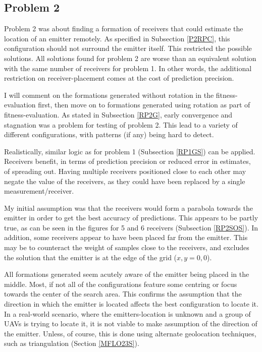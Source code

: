\documentclass[10pt,a4paper]{book}
\begin{document}
\newpage
\subsection{Problem 2}

Problem 2 was about finding a formation of receivers that could estimate the location of an emitter remotely. As specified in Subsection \ref{P2RPC}, this configuration should not surround the emitter itself. This restricted the possible solutions. All solutions found for problem 2 are worse than an equivalent solution with the same number of receivers for problem 1. In other words, the additional restriction on receiver-placement comes at the cost of prediction precision. 

I will comment on the formations generated without rotation in the fitness-evaluation first, then move on to formations generated using rotation as part of fitness-evaluation. As stated in Subsection \ref{RP2G}, early convergence and stagnation was a problem for testing of problem 2. This lead to a variety of different configurations, with patterns (if any) being hard to detect. 

Realistically, similar logic as for problem 1 (Subsection \ref{RP1GS}) can be applied. Receivers benefit, in terms of prediction precision or reduced error in estimates, of spreading out. Having multiple receivers positioned close to each other may negate the value of the receivers, as they could have been replaced by a single measurement/receiver. 

My initial assumption was that the receivers would form a parabola towards the emitter in order to get the best accuracy of predictions. This appears to be partly true, as can be seen in the figures for 5 and 6 receivers (Subsection \ref{RP2SOS}).  In addition, some receivers appear to have been placed far from the emitter. This may be to counteract the weight of samples close to the receivers, and excludes the solution that the emitter is at the edge of the grid ($x,y = 0,0$). 

All formations generated seem acutely aware of the emitter being placed in the middle. Most, if not all of the configurations feature some centring or focus towards the center of the search area. This confirms the assumption that the direction in which the emitter is located affects the best configuration to locate it. In a real-world scenario, where the emitters-location is unknown and a group of \glspl{UAV} is trying to locate it, it is not viable to make assumption of the direction of the emitter. Unless, of course, this is done using alternate geolocation techniques, such as triangulation (Section \ref{MFLO23S}).
\end{document}
